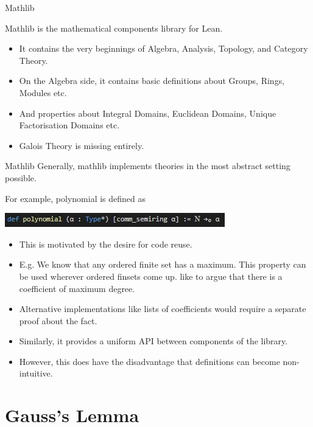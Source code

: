 \documentclass{beamer}
\begin{document}
\begin{frame}{Mathlib}

  Mathlib is the mathematical components library for Lean. 
  \begin{itemize}
    \item It contains the very beginnings of Algebra, Analysis, Topology, and Category Theory. 
    \item On the Algebra side, it contains basic definitions about Groups, Rings, Modules etc. 
    \item And properties about Integral Domains, Euclidean Domains, Unique Factorisation Domains etc. 
    \item Galois Theory is missing entirely.  
  \end{itemize}


\end{frame}

\begin{frame}{Mathlib}
  Generally, mathlib implements theories in the most abstract setting possible. 

  For example, polynomial is defined as

  \includegraphics{polynomial.png}

  \begin{itemize}
    \item  This is motivated by the desire for code reuse. 
    \item E.g. We know that any ordered finite set has a maximum. This property can be used wherever ordered finsets come up. 
          like to argue that there is a coefficient of maximum degree. 
    \item Alternative implementations like lists of coefficients would require a separate proof about the fact. 
    \item Similarly, it provides a uniform API between components of the library. 
    \item However, this does have the disadvantage that definitions can become non-intuitive.
  \end{itemize}
\end{frame}

\section {Gauss's Lemma}
\end{document}
